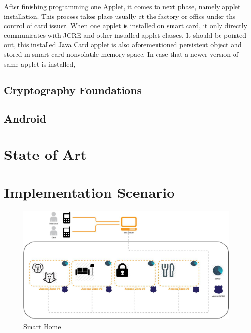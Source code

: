\documentclass[]{llncs}
\begin{document}
After finishing programming one Applet, it comes to next phase, namely applet installation. This process takes place usually at the factory or office under the control of card issuer. When one applet is installed on smart card, it only directly communicates with JCRE and other installed applet classes. It should be pointed out, this installed Java Card applet is also aforementioned persistent object and stored in smart card nonvolatile memory space. In case that a newer version of same applet is installed, 

\subsection{Cryptography Foundations}
\subsection{Android}

\section{State of Art}
\section{Implementation Scenario}
 \begin{figure}[!htbp]
	\centering
	\includegraphics[width=1.2\textwidth]{homeoverview.jpg}
		\caption[ ]{Smart Home}
	\label{fig:SmartHome}
\end{figure}
\end{document}
